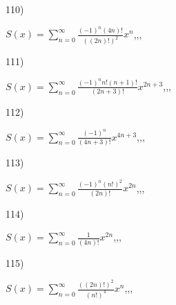 \documentclass[11pt, ukrainian]{article}
\begin{document}
\par
\vspace{0.9cm}
110) \space 
{%
{$S(x)=\sum\limits_{n=0}^{\infty}{\frac{{(-1)^n}(4n)!}{{((2n)!)^2}}}{x^{{n}}}$},,, \par \smallskip  
}
\par
\newpage
111) \space 
{%
{$S(x)=\sum\limits_{n=0}^{\infty}{\frac{{(-1)^n}n!(n+1)!}{(2n+3)!}}{x^{{2n+3}}}$},,, \par \smallskip  
}
\par
\vspace{0.9cm}
112) \space 
{%
{$S(x)=\sum\limits_{n=0}^{\infty}{\frac{(-1)^n}{(4n+3)!}}{x^{{4n+3}}}$},,, \par \smallskip  
}
\par
\vspace{0.9cm}
113) \space 
{%
{$S(x)=\sum\limits_{n=0}^{\infty}{\frac{{(-1)^n}{(n!)^2}}{(2n)!}}{x^{{2n}}}$},,, \par \smallskip  
}
\par
\vspace{0.9cm}
114) \space 
{%
{$S(x)=\sum\limits_{n=0}^{\infty}{\frac{1}{(4n)!}}{x^{{2n}}}$},,, \par \smallskip  
}
\par
\vspace{0.9cm}
115) \space 
{%
{$S(x)=\sum\limits_{n=0}^{\infty}{\frac{((2n)!)^2}{(n!)^4}}{x^{{n}}}$},,, \par \smallskip  
}
\end{document}
